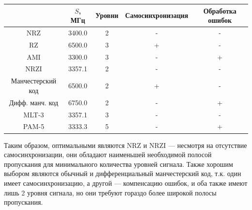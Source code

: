 \begin{center}
    \begin{tabular}{c|cccc}
        & $S$, МГц
        & Уровни
        & Самосинхронизация
        & Обработка ошибок \\ \hline
        NRZ               & 3400.0 & 2 & - & - \\
        RZ                & 6500.0 & 3 & + & - \\
        AMI               & 3300.0 & 3 & - & + \\
        NRZI              & 3357.1 & 2 & - & - \\
        Манчестерский код & 6500.0 & 2 & + & - \\
        Дифф. манч. код   & 6750.0 & 2 & - & + \\
        MLT-3             & 3357.1 & 3 & - & - \\
        PAM-5             & 3333.3 & 5 & - & + \\
    \end{tabular}
\end{center}

Таким образом, оптимальными являются NRZ и NRZI --- несмотря на отсутствие самосинхронизации,
они обладают наименьшей необходимой полосой пропускания для минимального количества уровней сигнала.
Также хорошим выбором являются обычный и дифференциальный манчестерский код, т.к.
один имеет самосинхронизацию, а другой --- компенсацию ошибок, и оба также имеют лишь 2 уровня сигнала,
но они требуют гораздо более широкой полосы пропускания.
